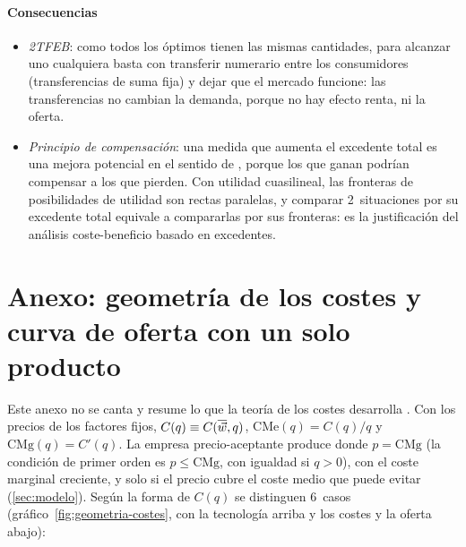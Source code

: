 \documentclass[11pt]{article}
\begin{document}
\paragraph{Consecuencias}

\begin{itemize}
\item \emph{2TFEB}: como todos los óptimos tienen las mismas cantidades, para alcanzar uno cualquiera basta con transferir numerario entre los consumidores (transferencias de suma fija) y dejar que el mercado funcione: las transferencias no cambian la demanda, porque no hay efecto renta, ni la oferta.
\item \emph{Principio de compensación}: una medida que aumenta el excedente total es una mejora potencial en el sentido de , porque los que ganan podrían compensar a los que pierden. Con utilidad cuasilineal, las fronteras de posibilidades de utilidad son rectas paralelas, y comparar 2~situaciones por su excedente total equivale a compararlas por sus fronteras: es la justificación del análisis coste-beneficio basado en excedentes.
\end{itemize}

\section{Anexo: geometría de los costes\cortetitulo{} y curva de oferta con un solo producto}\label{anexo:geometria}

Este anexo no se canta y resume lo que la teoría de los costes desarrolla . Con los precios de los factores fijos, $C(q)\equiv C(\overline{\vec{w}},q)$, $\mathrm{CMe}(q)=C(q)/q$ y $\mathrm{CMg}(q)=C'(q)$. La empresa precio-aceptante produce donde $p=\mathrm{CMg}$ (la condición de primer orden es $p\leq\mathrm{CMg}$, con igualdad si $q>0$), con el coste marginal creciente, y solo si el precio cubre el coste medio que puede evitar (\ref{sec:modelo}). Según la forma de $C(q)$\nocite{MasColellWhinstonGreen1995} se distinguen 6~casos (gráfico~\ref{fig:geometria-costes}, con la tecnología arriba y los costes y la oferta abajo):
\end{document}
